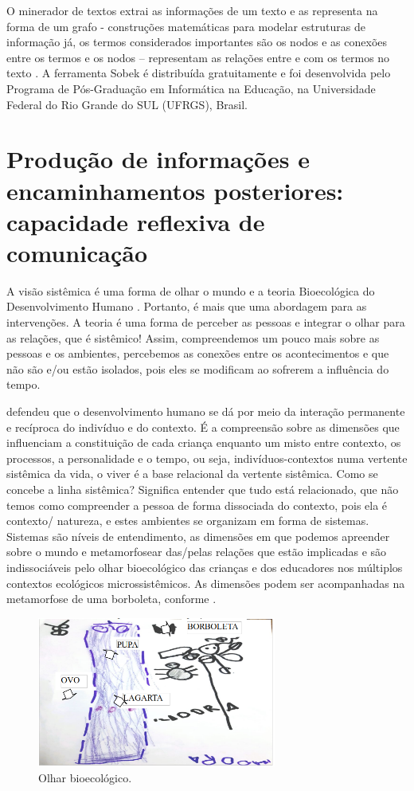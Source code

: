 \documentclass{textolivre}
\begin{document}
O minerador de textos extrai as informações de um texto e as representa na forma de um grafo - construções matemáticas para modelar estruturas de informação já, os termos considerados importantes são os nodos e as conexões entre os termos e os nodos – representam as relações entre e com os termos no texto \cite{epstein2017}. A ferramenta Sobek é distribuída gratuitamente e foi desenvolvida pelo Programa de Pós-Graduação em Informática na Educação, na Universidade Federal do Rio Grande do SUL (UFRGS), Brasil.




\section{Produção de informações e encaminhamentos posteriores: capacidade reflexiva de comunicação}\label{sec-producao}

A visão sistêmica é uma forma de olhar o mundo e a teoria Bioecológica do Desenvolvimento Humano \cite{brofen2011}. Portanto, é mais que uma abordagem para as intervenções. A teoria é uma forma de perceber as pessoas e integrar o olhar para as relações, que é sistêmico! Assim, compreendemos um pouco mais sobre as pessoas e os ambientes, percebemos as conexões entre os acontecimentos e que não são e/ou estão isolados, pois eles se modificam ao sofrerem a influência do tempo. 

\textcite{brofen2011} defendeu que o desenvolvimento humano se dá por meio da interação permanente e recíproca do indivíduo e do contexto. É a compreensão sobre as dimensões que influenciam a constituição de cada criança enquanto um misto entre contexto, os processos, a personalidade e o tempo, ou seja, indivíduos-contextos numa vertente sistêmica da vida, o viver é a base relacional da vertente sistêmica. Como se concebe a linha sistêmica? Significa entender que tudo está relacionado, que não temos como compreender a pessoa de forma dissociada do contexto, pois ela é contexto/ natureza, e estes ambientes se organizam em forma de sistemas. Sistemas são níveis de entendimento, as dimensões em que podemos apreender sobre o mundo e metamorfosear das/pelas relações que estão implicadas e são indissociáveis pelo olhar bioecológico das crianças e dos educadores nos múltiplos contextos ecológicos microssistêmicos. As dimensões podem ser acompanhadas na metamorfose de uma borboleta, conforme . 

\begin{figure}[h!]
 \centering
 \includegraphics[width=0.7\textwidth]{figure03.png}
 \caption{Olhar bioecológico.}
 \label{fig-fig03}
\end{figure}
\end{document}
